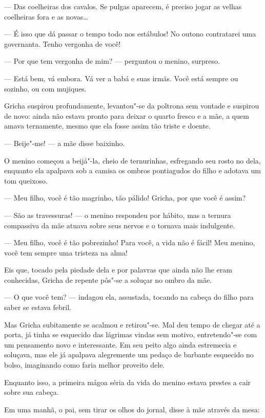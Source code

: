 --- Das coelheiras dos cavalos. Se pulgas aparecem, é preciso jogar as
velhas coelheiras fora e as novas\ldots{}

--- É isso que dá passar o tempo todo nos estábulos! No outono
contratarei uma governanta. Tenho vergonha de você!

--- Por que tem vergonha de mim? --- perguntou o menino, surpreso.

--- Está bem, vá embora. Vá ver a babá e suas irmãs. Você está sempre ou
sozinho, ou com mujiques.

Gricha suspirou profundamente, levantou"-se da poltrona sem vontade e
suspirou de novo: ainda não estava pronto para deixar o quarto
fresco e a mãe, a quem amava ternamente, mesmo que ela fosse assim tão
triste e doente.

--- Beije"-me! --- a mãe disse baixinho.

O menino começou a beijá"-la, cheio de ternurinhas, esfregando seu rosto
no dela, enquanto ela apalpava sob a camisa os ombros pontiagudos do
filho e adotava um tom queixoso.

--- Meu filho, você é tão magrinho, tão pálido! Gricha, por que você é
assim?

--- São as travessuras! --- o menino respondeu por hábito, mas a ternura
compassiva da mãe atuava sobre seus nervos e o tornava mais indulgente.

--- Meu filho, você é tão pobrezinho! Para você, a vida não é fácil! Meu
menino, você tem sempre uma tristeza na alma!

Eis que, tocado pela piedade dela e por palavras que ainda não lhe eram
conhecidas, Gricha de repente pôs"-se a soluçar no ombro da mãe.

--- O que você tem? --- indagou ela, assustada, tocando na cabeça do
filho para saber se estava febril.

Mas Gricha subitamente se acalmou e retirou"-se. Mal deu tempo de chegar
até a porta, já tinha se esquecido das lágrimas vindas sem motivo,
entretendo"-se com um pensamento novo e interessante. Em seu peito algo
ainda estremecia e soluçava, mas ele já apalpava alegremente um pedaço
de barbante esquecido no bolso, imaginando como faria melhor proveito
dele.

\asterisc

Enquanto isso, a primeira mágoa séria da vida do menino estava prestes a
cair sobre sua cabeça.

Em uma manhã, o pai, sem tirar os olhos do jornal, disse à mãe através
da mesa:

